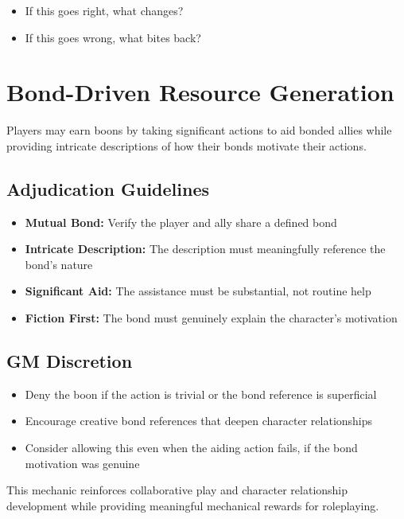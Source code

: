 \begin{itemize}
    \item If this goes right, what changes?
    \item If this goes wrong, what bites back?
\end{itemize}

\section{Bond-Driven Resource Generation}

Players may earn boons by taking significant actions to aid bonded allies while providing intricate descriptions of how their bonds motivate their actions.

\subsection{Adjudication Guidelines}
\begin{itemize}
    \item \textbf{Mutual Bond:} Verify the player and ally share a defined bond
    \item \textbf{Intricate Description:} The description must meaningfully reference the bond's nature
    \item \textbf{Significant Aid:} The assistance must be substantial, not routine help
    \item \textbf{Fiction First:} The bond must genuinely explain the character's motivation
\end{itemize}

\subsection{GM Discretion}
\begin{itemize}
    \item Deny the boon if the action is trivial or the bond reference is superficial
    \item Encourage creative bond references that deepen character relationships
    \item Consider allowing this even when the aiding action fails, if the bond motivation was genuine
\end{itemize}

This mechanic reinforces collaborative play and character relationship development while providing meaningful mechanical rewards for roleplaying.

